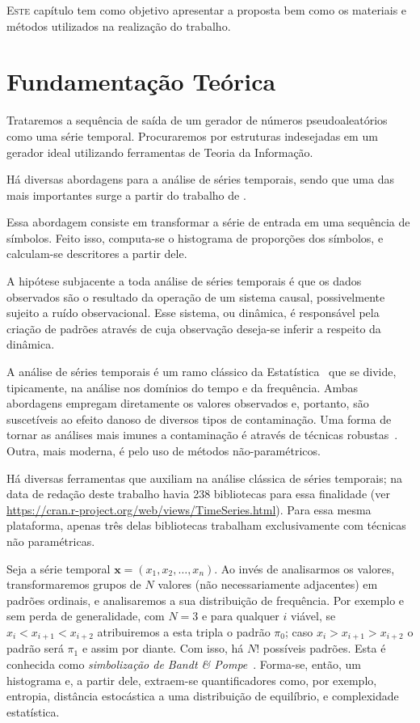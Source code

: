 
  \lettrine{E}{ste} capítulo tem como objetivo apresentar a proposta bem como os materiais e métodos utilizados na realização do trabalho.
  
\section{Fundamentação Teórica}

Trataremos a sequência de saída de um gerador de números pseudoaleatórios como uma série temporal.
Procuraremos por estruturas indesejadas em um gerador ideal utilizando ferramentas de Teoria da Informação.

Há diversas abordagens para a análise de séries temporais, sendo que uma das mais importantes surge a partir do trabalho de \citet{PermutationEntropyBandtPompe}.

Essa abordagem consiste em transformar a série de entrada em uma sequência de símbolos.
Feito isso, computa-se o histograma de proporções dos símbolos, e calculam-se descritores a partir dele.

A hipótese subjacente a toda análise de séries temporais é que os dados observados são o resultado da operação de um sistema causal, possivelmente sujeito a ruído observacional.
Esse sistema, ou dinâmica, é responsável pela criação de padrões através de cuja observação deseja-se inferir a respeito da dinâmica.
 
A análise de séries temporais é um ramo clássico da Estatística~\cite{BrockwellDavis91} que se divide, tipicamente, na análise nos domínios do tempo e da frequência.
Ambas abordagens empregam diretamente os valores observados e, portanto, são suscetíveis ao efeito danoso de diversos tipos de contaminação.
Uma forma de tornar as análises mais imunes a contaminação é através de técnicas robustas~\cite{BustosFraiman1984}.
Outra, mais moderna, é pelo uso de métodos não-paramétricos.
 
Há diversas ferramentas que auxiliam na análise clássica de séries temporais; na data de redação deste trabalho havia \num{238} bibliotecas para essa finalidade (ver \url{https://cran.r-project.org/web/views/TimeSeries.html}).
Para essa mesma plataforma, apenas três delas bibliotecas trabalham exclusivamente com técnicas não paramétricas.

Seja a série temporal $\bm x = (x_1, x_2, \dots, x_n)$.
Ao invés de analisarmos os valores, transformaremos grupos de $N$ valores (não necessariamente adjacentes) em padrões ordinais, e analisaremos a sua distribuição de frequência.
Por exemplo e sem perda de generalidade, com $N=3$ e para qualquer $i$ viável,
se $x_i<x_{i+1}<x_{i+2}$ atribuiremos a esta tripla o padrão $\pi_0$;
caso $x_i>x_{i+1}>x_{i+2}$ o padrão será $\pi_1$ e assim por diante.
Com isso, há $N!$ possíveis padrões.
Esta é conhecida como \textit{simbolização de Bandt \& Pompe}~\cite{PermutationEntropyBandtPompe}.
Forma-se, então, um histograma e, a partir dele, extraem-se quantificadores como, por exemplo, entropia, distância estocástica a uma distribuição de equilíbrio, e complexidade estatística.
 
